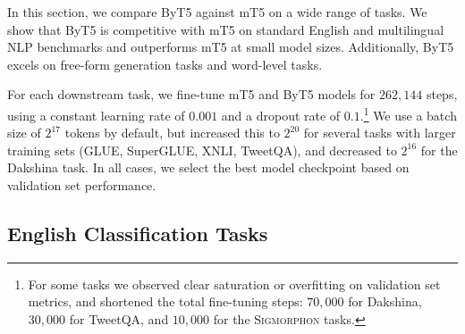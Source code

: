 \documentclass[11pt,a4paper]{article}
\begin{document}
In this section, we compare ByT5 against mT5 on a wide range of tasks. We show that ByT5 is competitive with mT5 on standard English and multilingual NLP benchmarks and outperforms mT5 at small model sizes. Additionally, ByT5 excels on free-form generation tasks and word-level tasks.

For each downstream task, we fine-tune mT5 and ByT5 models for $262{,}144$ steps, using a constant learning rate of $0.001$ and a dropout rate of $0.1$.\footnote{For some tasks we observed clear saturation or overfitting on validation set metrics, and shortened the total fine-tuning steps: $70{,}000$ for Dakshina, $30{,}000$ for TweetQA, and $10{,}000$ for the \textsc{Sigmorphon} tasks.} We use a batch size of $2^{17}$ tokens by default, but increased this to $2^{20}$ for several tasks with larger training sets (GLUE, SuperGLUE, XNLI, TweetQA), and decreased to $2^{16}$ for the Dakshina task. In all cases, we select the best model checkpoint based on validation set performance.

\subsection{English Classification Tasks}

\begin{table}[t!]
\centering
{}
\caption{mT5 and ByT5 performance on GLUE and SuperGLUE\@. For each benchmark, we fine-tune a single model on a mixture of all tasks, select the best checkpoint per task based on validation set performance, and report average validation set scores over all tasks.}
\label{tab:english_classification}
\end{table}
\end{document}
